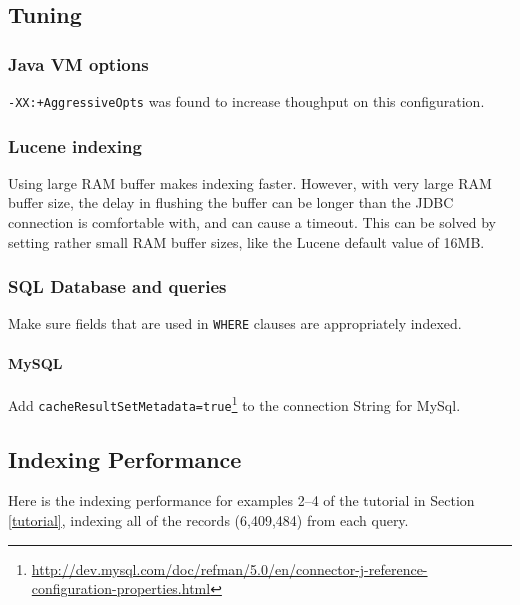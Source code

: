 
\subsection{Tuning}
\subsubsection{Java VM options}
\begin{mlist}
\item {\tt -XX:+AggressiveOpts} was found to increase thoughput on this configuration.
\end{mlist}

\subsubsection{Lucene indexing}
Using large RAM buffer makes indexing faster. 
However, with very large RAM buffer size, the delay in flushing the buffer can
be longer than the JDBC connection is comfortable with, and can cause a
timeout. 
This can be solved by setting rather small RAM buffer sizes, like the Lucene
default value of 16MB.

\subsubsection{SQL Database and queries}
\begin{mlist}
\item Make sure fields that are used in {\tt WHERE} clauses are appropriately indexed.
\end{mlist}

\paragraph{MySQL}
\begin{mlist}

\item Add {\tt cacheResultSetMetadata=true}\footnote{\url{http://dev.mysql.com/doc/refman/5.0/en/connector-j-reference-configuration-properties.html}} 
  to the connection String for MySql. 
\end{mlist}


\subsection{Indexing Performance}
Here is the indexing performance for examples 2--4 of the tutorial in
Section \ref{tutorial}, indexing all of the records (6,409,484) from each
query.  

